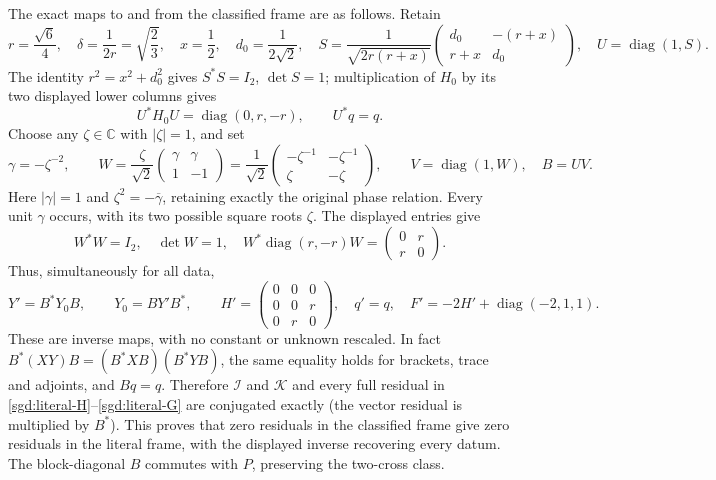 The exact maps to and from the classified frame are as follows. Retain
\[
 r=\frac{\sqrt6}{4},\quad \delta=\frac1{2r}=\sqrt{\frac23},\quad
 x=\frac12,\quad d_0=\frac1{2\sqrt2},\quad
 S=\frac1{\sqrt{2r(r+x)}}
       \begin{pmatrix}d_0&-(r+x)\\r+x&d_0\end{pmatrix},\quad
 U=\operatorname{diag}(1,S).
\]
The identity $r^2=x^2+d_0^2$ gives $S^*S=I_2$, $\det S=1$;
multiplication of $H_0$ by its two displayed lower columns gives
\[
 U^*H_0U=\operatorname{diag}(0,r,-r),\qquad U^*q=q.
\]
Choose any $\zeta\in\mathbb C$ with $|\zeta|=1$, and set
\[
 \gamma=-\zeta^{-2},\qquad
 W=\frac\zeta{\sqrt2}\begin{pmatrix}\gamma&\gamma\\1&-1\end{pmatrix}
  =\frac1{\sqrt2}\begin{pmatrix}-\zeta^{-1}&-\zeta^{-1}\\
                         \zeta&-\zeta\end{pmatrix},\qquad
 V=\operatorname{diag}(1,W),\quad B=UV.
\]
Here $|\gamma|=1$ and $\zeta^2=-\overline\gamma$, retaining exactly
the original phase relation. Every unit $\gamma$ occurs, with its two
possible square roots $\zeta$. The displayed entries give
\[
 W^*W=I_2,\quad \det W=1,\quad
 W^*\operatorname{diag}(r,-r)W=\begin{pmatrix}0&r\\r&0\end{pmatrix}.
\]
Thus, simultaneously for all data,
\begin{equation}
 Y'=B^*Y_0B,\qquad Y_0=BY'B^*,\qquad
 H'=\begin{pmatrix}0&0&0\\0&0&r\\0&r&0\end{pmatrix},\quad
 q'=q,\quad F'=-2H'+\operatorname{diag}(-2,1,1).
 \label{sgd:frame}
\end{equation}
These are inverse maps, with no constant or unknown rescaled. In fact
$B^*(XY)B=(B^*XB)(B^*YB)$, the same equality holds for brackets,
trace and adjoints, and $Bq=q$. Therefore $\mathcal I$ and $\mathcal K$
and every full residual in \eqref{sgd:literal-H}--\eqref{sgd:literal-G}
are conjugated exactly (the vector residual is multiplied by $B^*$).
This proves that zero residuals in the classified frame give zero residuals
in the literal frame, with the displayed inverse recovering every datum.
The block-diagonal $B$ commutes with $P$, preserving the two-cross class.

